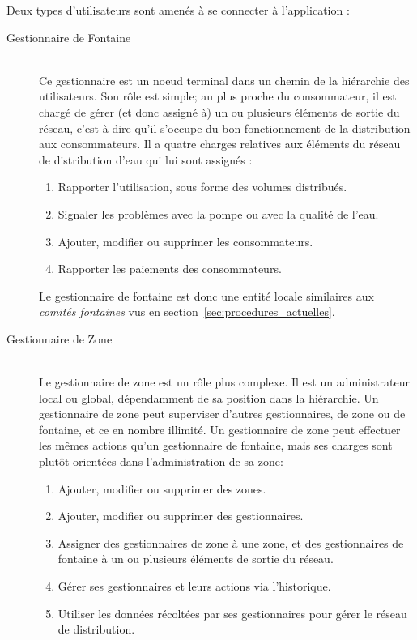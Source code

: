 \documentclass{EPL-master-thesis-covers-FR}
\begin{document}
				Deux types d'utilisateurs sont amenés à se connecter à l'application :
				\begin{description}
					\item[Gestionnaire de Fontaine] \hfill \\
						Ce gestionnaire est un noeud terminal dans un chemin de la hiérarchie des utilisateurs. Son rôle est simple; au plus proche du consommateur, il est chargé de gérer (et donc assigné à) un ou plusieurs éléments de sortie du réseau, c'est-à-dire qu'il s'occupe du bon fonctionnement de la distribution aux consommateurs. Il a quatre charges relatives aux éléments du réseau de distribution d'eau qui lui sont assignés :
							\begin{enumerate}
								\item Rapporter l'utilisation, sous forme des volumes distribués.
								\item Signaler les problèmes avec la pompe ou avec la qualité de l'eau.
								\item Ajouter, modifier ou supprimer les consommateurs.
								\item Rapporter les paiements des consommateurs.
							\end{enumerate}
						Le gestionnaire de fontaine est donc une entité locale similaires aux \emph{comités fontaines} vus en section~\ref{sec:procedures_actuelles}.
					\item[Gestionnaire de Zone] \hfill \\
						Le gestionnaire de zone est un rôle plus complexe. Il est un administrateur local ou global, dépendamment de sa position dans la hiérarchie. Un gestionnaire de zone peut superviser d'autres gestionnaires, de zone ou de fontaine, et ce en nombre illimité. Un gestionnaire de zone peut effectuer les mêmes actions qu'un gestionnaire de fontaine, mais ses charges sont plutôt orientées dans l'administration  de sa zone:
							\begin{enumerate}
								\item Ajouter, modifier ou supprimer des zones.
								\item Ajouter, modifier ou supprimer des gestionnaires.
								\item Assigner des gestionnaires de zone à une zone, et des gestionnaires de fontaine à un ou plusieurs éléments de sortie du réseau.
								\item Gérer ses gestionnaires et leurs actions via l'historique.
								\item Utiliser les données récoltées par ses gestionnaires pour gérer le réseau de distribution.
							\end{enumerate}
				\end{description}
\end{document}
